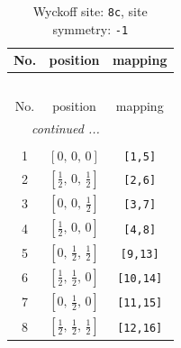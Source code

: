 \documentclass[fleqn,8pt]{jsarticle}
\begin{document}
\renewcommand{\arraystretch}{1.2}
\begin{longtable}{ccc}
\caption{Wyckoff site: {\tt 8c}, site symmetry: {\tt -1}}
 \\
 \hline \hline
No. & position & mapping \\ \hline \endfirsthead

\multicolumn{2}{l}{\tablename\ \thetable{}} \\
 \hline \hline
No. & position & mapping \\ \hline \endhead

 \hline \hline
\multicolumn{2}{r}{\footnotesize\it continued ...} \\ \endfoot

 \hline \hline
\multicolumn{2}{r}{} \\ \endlastfoot

1 & $\left[ 0,\, 0,\, 0 \right]$ & {\tt [1,5]} \\ \hline
2 & $\left[ \frac{1}{2},\, 0,\, \frac{1}{2} \right]$ & {\tt [2,6]} \\ \hline
3 & $\left[ 0,\, 0,\, \frac{1}{2} \right]$ & {\tt [3,7]} \\ \hline
4 & $\left[ \frac{1}{2},\, 0,\, 0 \right]$ & {\tt [4,8]} \\ \hline
5 & $\left[ 0,\, \frac{1}{2},\, \frac{1}{2} \right]$ & {\tt [9,13]} \\ \hline
6 & $\left[ \frac{1}{2},\, \frac{1}{2},\, 0 \right]$ & {\tt [10,14]} \\ \hline
7 & $\left[ 0,\, \frac{1}{2},\, 0 \right]$ & {\tt [11,15]} \\ \hline
8 & $\left[ \frac{1}{2},\, \frac{1}{2},\, \frac{1}{2} \right]$ & {\tt [12,16]} \\
\end{longtable}
\renewcommand{\arraystretch}{1.2}
\end{document}
